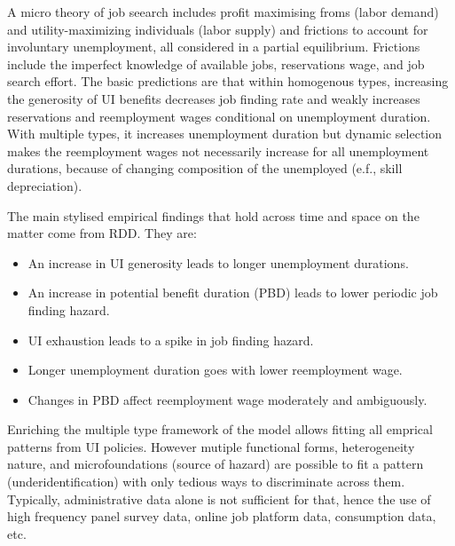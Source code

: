 \documentclass{article}
\begin{document}
A micro theory of job seearch includes profit maximising froms (labor demand) and utility-maximizing individuals (labor supply) and frictions to account for involuntary unemployment, all considered in a partial equilibrium. Frictions include the imperfect knowledge of available jobs, reservations wage, and job search effort. The basic predictions are that within homogenous types, increasing the generosity of UI benefits decreases job finding rate and weakly increases reservations and reemployment wages conditional on unemployment duration. With multiple types, it increases unemployment duration but dynamic selection makes the reemployment wages not necessarily increase for all unemployment durations, because of changing composition of the unemployed (e.f., skill depreciation).

The main stylised empirical findings that hold across time and space on the matter come from RDD. They are:
\begin{itemize}
    \item An increase in UI generosity leads to longer unemployment durations.
    \item An increase in potential benefit duration (PBD) leads to lower periodic job finding hazard.
    \item UI exhaustion leads to a spike in job finding hazard.
    \item Longer unemployment duration goes with lower reemployment wage.
    \item Changes in PBD affect reemployment wage moderately and ambiguously.
\end{itemize}
 









Enriching the multiple type framework of the model allows fitting all emprical patterns from UI policies. However mutiple functional forms, heterogeneity nature, and microfoundations (source of hazard) are possible to fit a pattern (underidentification) with only tedious ways to discriminate across them. Typically, administrative data alone is not sufficient for that, hence the use of high frequency panel survey data, online job platform data, consumption data, etc.
\end{document}
